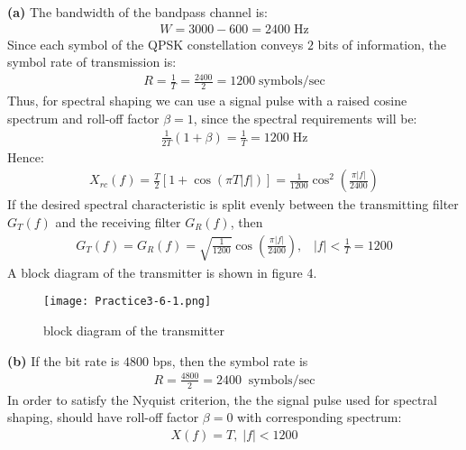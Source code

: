 \documentclass[a4paper,12pt]{article}
\begin{document}
\begin{enumerate}
            \textbf{(a)} 
            The bandwidth of the bandpass channel is: 
            \begin{align*}
                W = 3000 - 600 = 2400 \; \text{Hz}
            \end{align*}
            Since each symbol of the QPSK constellation conveys $2$ bits of information, the symbol rate of transmission is: 
            \begin{align*}
                R = \frac{1}{T} = \frac{2400}{2} = 1200 \; \text{symbols/sec}
            \end{align*}
            Thus, for spectral shaping we can use a signal pulse with a raised cosine spectrum and roll-off factor $\beta = 1$, since the spectral requirements will be:
            \begin{align*}
                \frac{1}{2T} (1 + \beta) = \frac{1}{T} = 1200 \; \text{Hz}
            \end{align*}
            Hence:
            \begin{align*}
                X_{rc}(f) = \frac{T}{2} \left[ 1 + \cos(\pi T |f|) \right] = \frac{1}{1200} \cos^2 \left( \frac{\pi|f|}{2400} \right)
            \end{align*}
            If the desired spectral characteristic is split evenly between the transmitting filter $G_T(f)$ and the receiving filter $G_R(f)$, then 
            \begin{align*}
                G_T(f) = G_R(f) = \sqrt{\frac{1}{1200}} \cos \left( \frac{\pi|f|}{2400} \right), \;\;\; |f| < \frac{1}{T} = 1200
            \end{align*}
            A block diagram of the transmitter is shown in figure 4.
            \begin{figure}[h]
            	\centering
            	\texttt{[image: Practice3-6-1.png]}
            	\caption{block diagram of the transmitter}
            \end{figure} 
            \newpage
            \textbf{(b)} 
            If the bit rate is $4800$ bps, then the symbol rate is
            \begin{align*}
                R = \frac{4800}{2} = 2400 \;\; \text{symbols/sec}
            \end{align*}
            In order to satisfy the Nyquist criterion, the the signal pulse used for spectral shaping, should have roll-off factor $\beta = 0$ with corresponding spectrum:
            \begin{align*}
                X(f) = T, \; |f| < 1200

\end{align*}
\end{enumerate}
\end{document}
